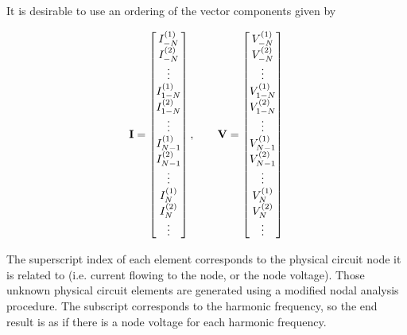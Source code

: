 
It is desirable to use an ordering of the vector components given by

\begin{equation}\label{eqn:ece1254projectReport:580}
\BI =
\begin{bmatrix}
I^{(1)}_{-N} \\
I^{(2)}_{-N} \\
\vdots \\
I^{(1)}_{1-N} \\
I^{(2)}_{1-N} \\
\vdots \\
I^{(1)}_{N-1} \\
I^{(2)}_{N-1} \\
\vdots \\
I^{(1)}_{N} \\
I^{(2)}_{N} \\
\vdots \\
\end{bmatrix},
\qquad \BV =
\begin{bmatrix}
V^{(1)}_{-N} \\
V^{(2)}_{-N} \\
\vdots \\
V^{(1)}_{1-N} \\
V^{(2)}_{1-N} \\
\vdots \\
V^{(1)}_{N-1} \\
V^{(2)}_{N-1} \\
\vdots \\
V^{(1)}_{N} \\
V^{(2)}_{N} \\
\vdots \\
\end{bmatrix}
\end{equation}

The superscript index of each element corresponds to the physical circuit node it is related to (i.e.
current flowing to the node, or the node voltage).
Those unknown physical circuit elements are generated using a modified nodal analysis procedure.
The subscript corresponds to the harmonic frequency, so the end result is as if there is a
node voltage for each harmonic frequency.

